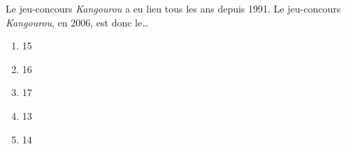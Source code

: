 Le jeu-concours {\em Kangourou} a eu lieu tous les ans depuis 1991. Le
jeu-concours {\em Kangourou}, en 2006, est donc le\ldots
\begin{multicols}{5}
  \begin{enumerate}[A/]
  \item 15\ieme
  \item 16\ieme
  \item 17\ieme
  \item 13\ieme
  \item 14\ieme
  \end{enumerate}
\end{multicols}